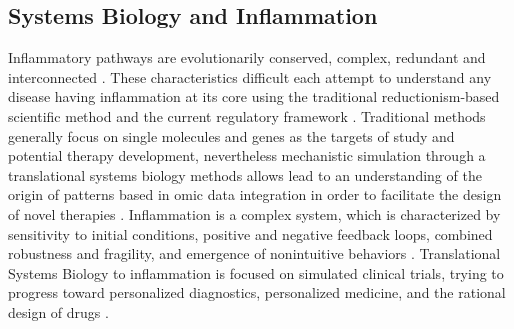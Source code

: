 \subsection*{Systems Biology and  Inflammation}
Inflammatory pathways are evolutionarily conserved, complex, redundant and interconnected \cite{Vodovotz2010} . These characteristics difficult each attempt to understand any disease having inflammation at its core using the traditional reductionism-based scientific method and the current regulatory framework \cite{Vodovotz2008}. Traditional methods generally focus on single molecules and genes as the targets of study and potential therapy development, nevertheless mechanistic simulation through a translational systems biology methods allows lead to an understanding of the origin of patterns based in omic data integration in order to facilitate the design of novel therapies \cite{An2011}. Inflammation is a complex system, which is characterized by sensitivity to initial conditions, positive and negative feedback loops, combined robustness and fragility, and emergence of nonintuitive behaviors \cite{Mi2010}. Translational Systems Biology to inflammation is focused on simulated clinical trials, trying to progress toward personalized diagnostics, personalized medicine, and the rational design of drugs \cite{Vodovotz2010}.


